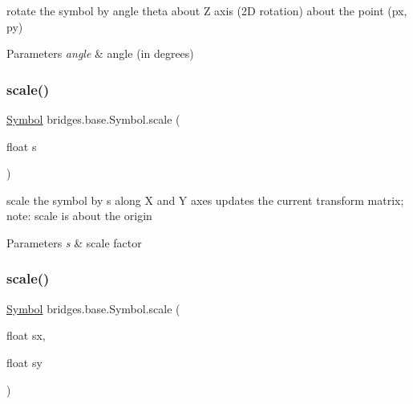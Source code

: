 rotate the symbol by angle theta about Z axis (2D rotation) about the point (px, py)


\begin{DoxyParams}{Parameters}
{\em angle} & angle (in degrees) \\
\hline
\end{DoxyParams}
\mbox{\label{classbridges_1_1base_1_1_symbol_a34c091fbe99b1e16a1648e66eca41253}} 
\subsubsection{\texorpdfstring{scale()}{scale()}\hspace{0.1cm}{\footnotesize\ttfamily [1/3]}}
{\footnotesize\ttfamily \hyperlink{classbridges_1_1base_1_1_symbol}{Symbol} bridges.\+base.\+Symbol.\+scale (\begin{DoxyParamCaption}\item[{float}]{s }\end{DoxyParamCaption})}

scale the symbol by s along X and Y axes updates the current transform matrix; note\+: scale is about the origin


\begin{DoxyParams}{Parameters}
{\em s} & scale factor \\
\hline
\end{DoxyParams}
\mbox{\label{classbridges_1_1base_1_1_symbol_ac0b434638e271e80eca52ca0306f64bf}} 
\subsubsection{\texorpdfstring{scale()}{scale()}\hspace{0.1cm}{\footnotesize\ttfamily [2/3]}}
{\footnotesize\ttfamily \hyperlink{classbridges_1_1base_1_1_symbol}{Symbol} bridges.\+base.\+Symbol.\+scale (\begin{DoxyParamCaption}\item[{float}]{sx,  }\item[{float}]{sy }\end{DoxyParamCaption})}

